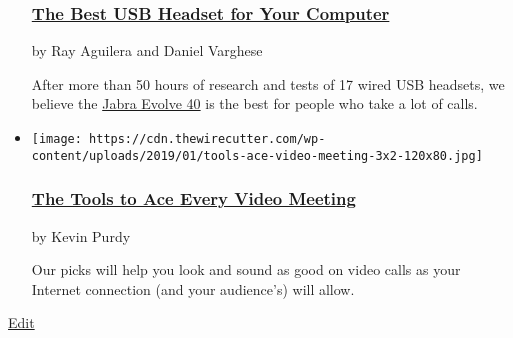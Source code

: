 \begin{itemize}
  \hypertarget{the-best-usb-headset-for-your-computer}{%
  \subsubsection{\texorpdfstring{\href{https://www.nytimes.com/wirecutter/reviews/best-usb-office-headset/}{The
  Best USB Headset for Your
  Computer}}{The Best USB Headset for Your Computer}}\label{the-best-usb-headset-for-your-computer}}

  by Ray Aguilera and Daniel Varghese

  After more than 50 hours of research and tests of 17 wired USB
  headsets, we believe the
  \href{https://www.nytimes.com/wirecutter/out/link/26521/161374/4/75083/?merchant=Jabra}{Jabra
  Evolve 40} is the best for people who take a lot of calls.
\item
  \href{https://www.nytimes.com/wirecutter/lists/the-tools-to-ace-every-video-meeting/}{}

  \texttt{[image: https://cdn.thewirecutter.com/wp-content/uploads/2019/01/tools-ace-video-meeting-3x2-120x80.jpg]}

  \hypertarget{the-tools-to-ace-every-video-meeting}{%
  \subsubsection{\texorpdfstring{\href{https://www.nytimes.com/wirecutter/lists/the-tools-to-ace-every-video-meeting/}{The
  Tools to Ace Every Video
  Meeting}}{The Tools to Ace Every Video Meeting}}\label{the-tools-to-ace-every-video-meeting}}

  by Kevin Purdy

  Our picks will help you look and sound as good on video calls as your
  Internet connection (and your audience's) will allow.
\end{itemize}

\href{https://thewirecutter.com/wp-admin/post.php?post=149697\&action=edit}{Edit}

